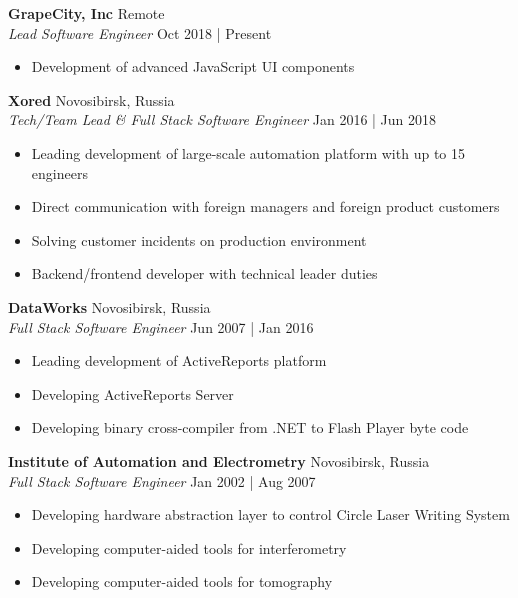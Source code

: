 \documentclass[a4paper]{article}
\begin{document}
\textbf{GrapeCity, Inc} \hfill Remote\\
\textit{Lead Software Engineer} \hfill Oct 2018 | Present\\
\vspace{-1mm}
\begin{itemize} \itemsep 1pt
	\item Development of advanced JavaScript UI components
\end{itemize}
\textbf{Xored} \hfill Novosibirsk, Russia\\
\textit{Tech/Team Lead \& Full Stack Software Engineer} \hfill Jan 2016 | Jun 2018\\
\vspace{-1mm}
\begin{itemize} \itemsep 1pt
	\item Leading development of large-scale automation platform with up to 15 engineers
	\item Direct communication with foreign managers and foreign product customers
	\item Solving customer incidents on production environment
	\item Backend/frontend developer with technical leader duties
\end{itemize}
\textbf{DataWorks} \hfill Novosibirsk, Russia\\
\textit{Full Stack Software Engineer} \hfill Jun 2007 | Jan 2016\\
\vspace{-1mm}
\begin{itemize} \itemsep 1pt
	\item Leading development of ActiveReports platform
	\item Developing ActiveReports Server
	\item Developing binary cross-compiler from .NET to Flash Player byte code
\end{itemize}
\textbf{Institute of Automation and Electrometry} \hfill Novosibirsk, Russia\\
\textit{Full Stack Software Engineer} \hfill Jan 2002 | Aug 2007\\
\vspace{-1mm}
\begin{itemize} \itemsep 1pt
	\item Developing hardware abstraction layer to control Circle Laser Writing System
	\item Developing computer-aided tools for interferometry
	\item Developing computer-aided tools for tomography
\end{itemize}
\end{document}
